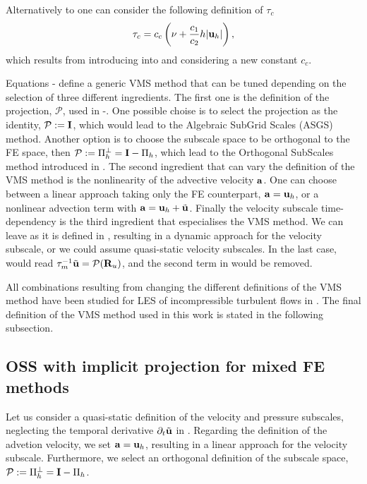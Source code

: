Alternatively to  one can consider the following definition of $ \tau_c $
\begin{equation}
\label{eq-C7_tau_c_alt}
\tau_c=c_c\left(\nu+\frac{c_1}{c_2}h|{\bf u}_h|\right),
\end{equation}
which results from introducing  into  and considering a new constant $ c_c $.

Equations - define a generic VMS method that can be tuned depending on the selection of three different ingredients. The first one is the definition of the projection, $ \mathcal{P} $, used in -. One possible choise is to select the projection as the identity, $\mathcal{P}:=\mathbf{I}$, which would lead to the Algebraic SubGrid Scales (ASGS) method. Another option is to choose the subscale space to be orthogonal to the FE space, then $ \mathcal{P}:=\Pi^\perp_h=\mathbf{I}-\Pi_h $, which lead to the Orthogonal SubScales method introduced in \cite{codina_stabilization_2000}. The second ingredient that can vary the definition of the VMS method is the nonlinearity of the advective velocity $ {\bf a} $. One can choose between a linear approach taking only the FE counterpart, $ {\bf a}={\bf u}_h $, or a nonlinear advection term with $ {\bf a}={\bf u}_h+\tilde{{\bf u}} $. Finally the velocity subscale time-dependency is the third ingredient that especialises the VMS method. We can leave as it is defined in , resulting in a dynamic approach for the velocity subscale, or we could assume quasi-static velocity subscales. In the last case,  would read $ \tau_m^{-1}\tilde{{\bf u}}=\mathcal{P}({\bf R}_u)$, and the second term in  would be removed.

All combinations resulting from changing the different definitions of the VMS method have been studied for LES of incompressible turbulent flows in \cite{colomes_assessment_2015}. The final definition of the VMS method used in this work is stated in the following subsection.

\subsection{OSS with implicit projection for mixed FE methods}
Let us consider a quasi-static definition of the velocity and pressure subscales, neglecting the temporal derivative $ \partial_t\tilde{{\bf u}} $ in . Regarding the definition of the advetion velocity, we set $ {\bf a}={\bf u}_h $, resulting in a linear approach for the velocity subscale. Furthermore, we select an orthogonal definition of the subscale space, $ \mathcal{P}:=\Pi_h^\perp=\mathbf{I}-\Pi_h $.

